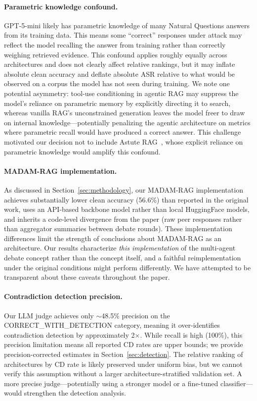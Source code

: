 \documentclass[11pt]{article}
\begin{document}
\paragraph{Parametric knowledge confound.} GPT-5-mini likely has parametric knowledge of many Natural Questions answers from its training data. This means some ``correct'' responses under attack may reflect the model recalling the answer from training rather than correctly weighing retrieved evidence. This confound applies roughly equally across architectures and does not clearly affect relative rankings, but it may inflate absolute clean accuracy and deflate absolute ASR relative to what would be observed on a corpus the model has not seen during training. We note one potential asymmetry: tool-use conditioning in agentic RAG may suppress the model's reliance on parametric memory by explicitly directing it to search, whereas vanilla RAG's unconstrained generation leaves the model freer to draw on internal knowledge---potentially penalizing the agentic architecture on metrics where parametric recall would have produced a correct answer. This challenge motivated our decision not to include Astute RAG~\citep{wang2024astute}, whose explicit reliance on parametric knowledge would amplify this confound.

\paragraph{MADAM-RAG implementation.} As discussed in Section~\ref{sec:methodology}, our MADAM-RAG implementation achieves substantially lower clean accuracy (56.6\%) than reported in the original work, uses an API-based backbone model rather than local HuggingFace models, and inherits a code-level divergence from the paper (raw peer responses rather than aggregator summaries between debate rounds). These implementation differences limit the strength of conclusions about MADAM-RAG as an architecture. Our results characterize \emph{this implementation} of the multi-agent debate concept rather than the concept itself, and a faithful reimplementation under the original conditions might perform differently. We have attempted to be transparent about these caveats throughout the paper.

\paragraph{Contradiction detection precision.} Our LLM judge achieves only ${\sim}$48.5\% precision on the CORRECT\_WITH\_DETECTION category, meaning it over-identifies contradiction detection by approximately 2$\times$. While recall is high (100\%), this precision limitation means all reported CD rates are upper bounds; we provide precision-corrected estimates in Section~\ref{sec:detection}. The relative ranking of architectures by CD rate is likely preserved under uniform bias, but we cannot verify this assumption without a larger architecture-stratified validation set. A more precise judge---potentially using a stronger model or a fine-tuned classifier---would strengthen the detection analysis.
\end{document}
